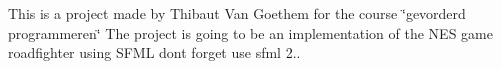 \href{https://travis-ci.com/thibautvangoethem/GevProgRoadFighter}{\tt }

This is a project made by Thibaut Van Goethem for the course \char`\"{}gevorderd programmeren\char`\"{} The project is going to be an implementation of the N\+ES game roadfighter using S\+F\+ML don\textquotesingle{}t forget use sfml 2.. 